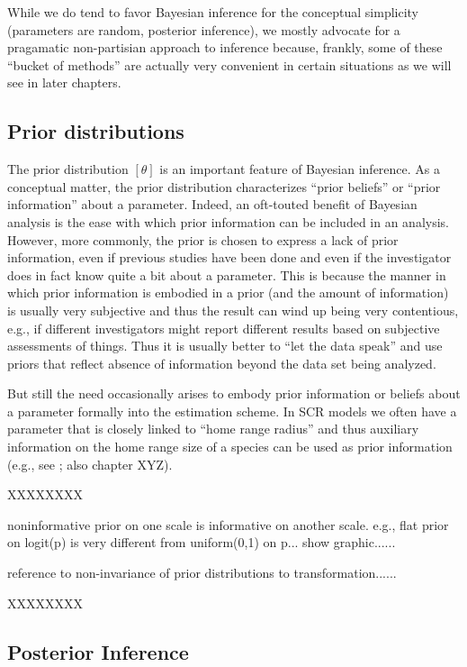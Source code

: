 While we do tend to favor Bayesian inference for the conceptual
simplicity (parameters are random, posterior inference), we mostly
advocate for a pragamatic non-partisian approach to inference because,
frankly, some of these ``bucket of methods'' are actually very
convenient in certain situations as we will see in later chapters.


\subsection{Prior distributions}


The prior distribution $[\theta]$ is an important feature of Bayesian
inference. As a conceptual matter, 
the prior distribution characterizes ``prior beliefs'' or ``prior
information'' about a parameter. Indeed, 
an oft-touted benefit of Bayesian analysis is the ease with which
prior information can be included in an analysis.
However, more commonly, the prior is chosen to
express a lack of prior information, even if previous studies have
been done and even if the investigator does in fact know quite a bit
about a parameter. 
This is because 
the manner in which prior information is embodied in a prior (and the
amount of information) is 
usually very subjective and thus the result can wind up being very
contentious, e.g., if different investigators might report different
results based on subjective assessments of things. Thus it is usually
better to ``let the data speak'' and use priors that reflect absence
of information beyond the data set being analyzed. 

But still the need occasionally arises to embody prior information or
beliefs about a parameter formally into the estimation scheme.
 In SCR models we often have a parameter that is closely linked
to ``home range radius'' and thus auxiliary information on the home
range size of a species can be used as prior information (e.g., see
\citet{chandler_royle:2012} ; also chapter XYZ). 

XXXXXXXX

noninformative prior on one scale is informative on another scale.
e.g., flat prior on logit(p) is very different from uniform(0,1) on
p...
show graphic......

reference to non-invariance of prior distributions to transformation......

XXXXXXXX

\subsection{Posterior Inference}

